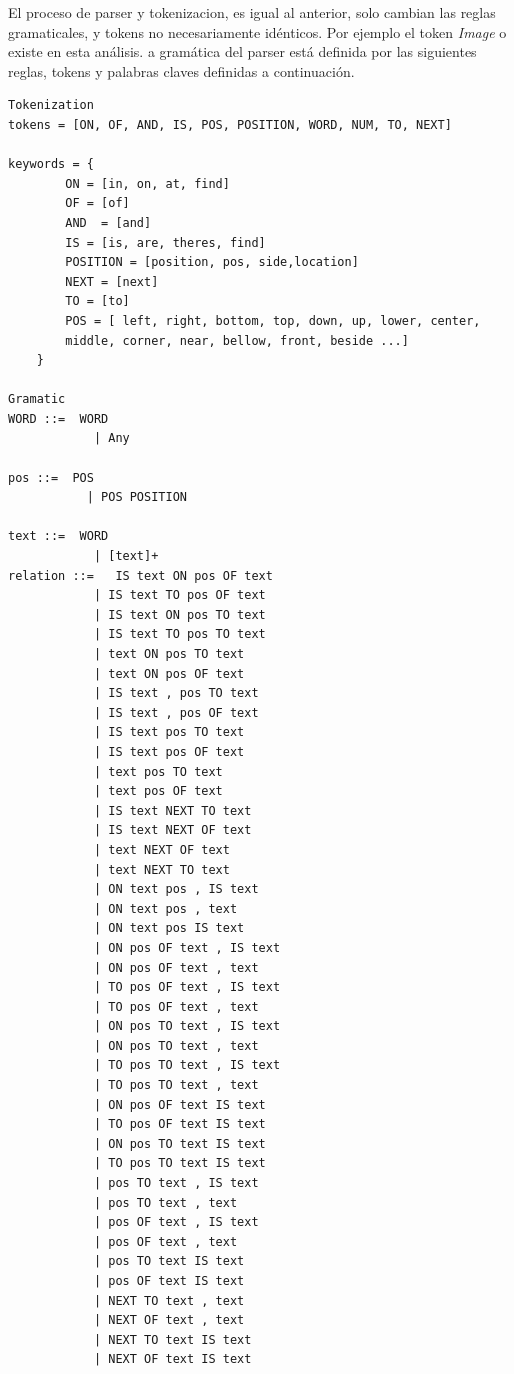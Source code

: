 El proceso de parser y tokenizacion, es igual al anterior, solo cambian las reglas gramaticales, y tokens no necesariamente id\'enticos. Por ejemplo el token \textit{Image} o existe en esta an\'alisis. a gram\'atica del parser est\'a definida por las siguientes reglas, tokens y palabras claves definidas a continuaci\'on.
\begin{verbatim}
Tokenization
tokens = [ON, OF, AND, IS, POS, POSITION, WORD, NUM, TO, NEXT]

keywords = {
        ON = [in, on, at, find]
        OF = [of]
        AND  = [and]
        IS = [is, are, theres, find]
        POSITION = [position, pos, side,location]
        NEXT = [next]
        TO = [to]
        POS = [ left, right, bottom, top, down, up, lower, center,
        middle, corner, near, bellow, front, beside ...]
    }

Gramatic    
WORD ::=  WORD
            | Any
    
pos ::=  POS
           | POS POSITION 

text ::=  WORD
            | [text]+
relation ::=   IS text ON pos OF text
            | IS text TO pos OF text
            | IS text ON pos TO text
            | IS text TO pos TO text
            | text ON pos TO text
            | text ON pos OF text
            | IS text , pos TO text
            | IS text , pos OF text
            | IS text pos TO text
            | IS text pos OF text
            | text pos TO text
            | text pos OF text
            | IS text NEXT TO text
            | IS text NEXT OF text
            | text NEXT OF text
            | text NEXT TO text
            | ON text pos , IS text
            | ON text pos , text
            | ON text pos IS text
            | ON pos OF text , IS text
            | ON pos OF text , text
            | TO pos OF text , IS text
            | TO pos OF text , text
            | ON pos TO text , IS text
            | ON pos TO text , text
            | TO pos TO text , IS text
            | TO pos TO text , text
            | ON pos OF text IS text
            | TO pos OF text IS text
            | ON pos TO text IS text
            | TO pos TO text IS text
            | pos TO text , IS text
            | pos TO text , text
            | pos OF text , IS text
            | pos OF text , text
            | pos TO text IS text
            | pos OF text IS text
            | NEXT TO text , text
            | NEXT OF text , text
            | NEXT TO text IS text
            | NEXT OF text IS text
\end{verbatim}

